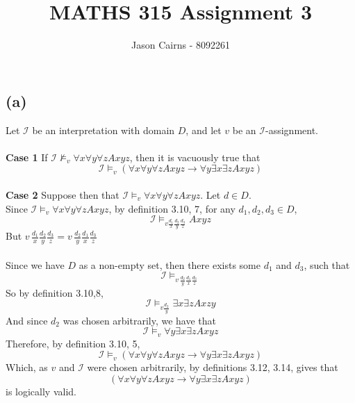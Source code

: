\documentclass[11pt,oneside,a4paper]{article}
\begin{document}
\title{MATHS 315 Assignment 3}
\author{Jason Cairns - 8092261}
\maketitle

\section{}
\subsection*{(a)}
Let $\mathcal{I}$ be an interpretation with domain $D$, and let $v$ be an $\mathcal{I}$-assignment.\\
\\
\textbf{Case 1} \quad If $\mathcal{I} \nvDash_v \forall x \forall y \forall z Axyz$, then it is vacuously true that 
$$\mathcal{I} \vDash_v (\forall x \forall y \forall z Axyz \to \forall y \exists x \exists z Axyz) $$\\
\textbf{Case 2} \quad Suppose then that $\mathcal{I} \vDash_v \forall x \forall y \forall z Axyz$. Let $d \in D$.\\
Since $\mathcal{I} \vDash_v \forall x \forall y \forall z Axyz$, by definition 3.10, 7, for any $d_1, d_2, d_3 \in D$,
$$\mathcal{I} \vDash_{v \frac{d_1}{x} \frac{d_2}{y} \frac{d_3}{z}}Axyz$$
But $v\, \frac{d_1}{x} \frac{d_2}{y} \frac{d_3}{z} = v\, \frac{d_2}{y} \frac{d_1}{x} \frac{d_3}{z}$\\
\\
Since we have $D$ as a non-empty set, then there exists some $d_1$ and $d_3$, such that
$$\mathcal{I} \vDash_{v\, \frac{d_2}{y} \frac{d_1}{x} \frac{d_3}{z}}$$
So by definition 3.10,8, 
$$\mathcal{I} \vDash_{v \frac{d_2}{y}} \exists x \exists z Axzy$$
And since $d_2$ was chosen arbitrarily, we have that
$$\mathcal{I} \vDash_v \forall y \exists x \exists z Axyz$$
Therefore, by definition 3.10, 5, 
$$\mathcal{I} \vDash_v (\forall x \forall y \forall z Axyz \to \forall y \exists x \exists z Axyz)$$
Which, as $v$ and $\mathcal{I}$ were chosen arbitrarily, by definitions 3.12, 3.14, gives that
$$(\forall x \forall y \forall z Axyz \to \forall y \exists x \exists z Axyz)$$ is logically valid.
\end{document}
